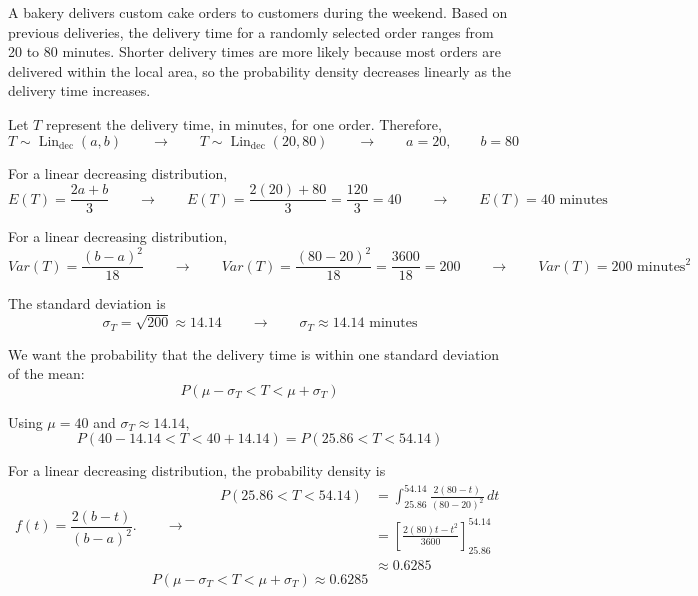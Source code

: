 
A bakery delivers custom cake orders to customers during the weekend.
Based on previous deliveries, the delivery time for a randomly selected
order ranges from 20 to 80 minutes. Shorter delivery times are more likely
because most orders are delivered within the local area, so the probability
density decreases linearly as the delivery time increases.

Let $T$ represent the delivery time, in minutes, for one order. Therefore,
\[
T\sim\operatorname{Lin}_{\mathrm{dec}}(a,b)
\qquad \longrightarrow \qquad
T\sim\operatorname{Lin}_{\mathrm{dec}}(20,80)
\qquad \longrightarrow \qquad
a=20,\qquad b=80
\]



For a linear decreasing distribution,
\[
E(T)=\frac{2a+b}{3}
\qquad \longrightarrow \qquad
E(T)
=\frac{2(20)+80}{3}
=\frac{120}{3}
=40
\qquad \longrightarrow \qquad
\boxed{E(T)=40\text{ minutes}}
\]


For a linear decreasing distribution,
\[
Var(T)=\frac{(b-a)^2}{18}
\qquad \longrightarrow \qquad
Var(T)
=\frac{(80-20)^2}{18}
=\frac{3600}{18}
=200
\qquad \longrightarrow \qquad
\boxed{Var(T)=200\text{ minutes}^2}
\]


The standard deviation is
\[
\sigma_T=\sqrt{200}
\approx14.14
\qquad \longrightarrow \qquad
\boxed{\sigma_T\approx14.14\text{ minutes}}
\]


We want the probability that the delivery time is within one standard
deviation of the mean:
\[
P(\mu-\sigma_T<T<\mu+\sigma_T)
\]

Using $\mu=40$ and $\sigma_T\approx14.14$,
\[
P(40-14.14<T<40+14.14)
=
P(25.86<T<54.14)
\]

For a linear decreasing distribution, the probability density is
\[
f(t)=\frac{2(b-t)}{(b-a)^2}.
\qquad \longrightarrow \qquad 
\begin{aligned}
	P(25.86<T<54.14)
	&=\int_{25.86}^{54.14}
	\frac{2(80-t)}{(80-20)^2}\,dt\\[4pt]
	&=\left[
	\frac{2(80)t-t^2}{3600}
	\right]_{25.86}^{54.14}\\[4pt]
	&\approx 0.6285
\end{aligned}
\]
\[
\boxed{P(\mu-\sigma_T<T<\mu+\sigma_T)\approx0.6285}
\]

